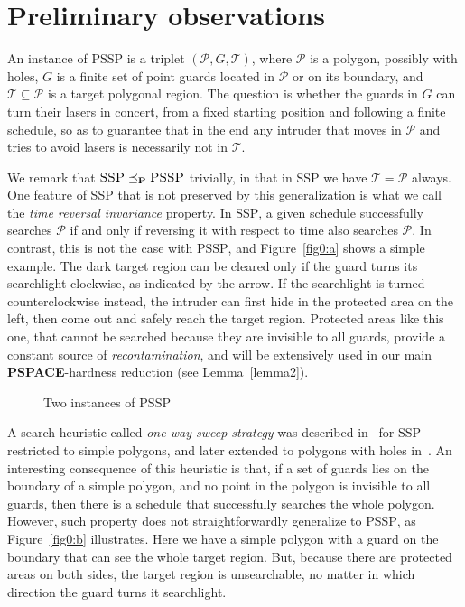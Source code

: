 \documentclass{style}
\newcommand{\complexityclass}[1]{\textbf{#1}}
\newcommand{\computproblem}[1]{\textsc{#1}}
\renewcommand{\P}{\complexityclass{P}\xspace}
\newcommand{\PSPACE}{\complexityclass{PSPACE}\xspace}
\newcommand{\SSP}{\computproblem{SSP}\xspace}
\newcommand{\PSSP}{\computproblem{PSSP}\xspace}
\begin{document}
\section{Preliminary observations}

An instance of \PSSP is a triplet $(\mathcal P,G,\mathcal T)$, where $\mathcal P$ is a polygon, possibly with holes, $G$ is a finite set of point guards located in $\mathcal P$ or on its boundary, and $\mathcal T \subseteq \mathcal P$ is a target polygonal region. The question is whether the guards in $G$ can turn their lasers in concert, from a fixed starting position and following a finite schedule, so as to guarantee that in the end any intruder that moves in $\mathcal P$ and tries to avoid lasers is necessarily not in $\mathcal T$.

We remark that $\SSP \preceq_{\P} \PSSP$ trivially, in that in \SSP we have $\mathcal T=\mathcal P$ always. One feature of \SSP that is not preserved by this generalization is what we call the \emph{time reversal invariance} property. In \SSP, a given schedule successfully searches $\mathcal P$ if and only if reversing it with respect to time also searches $\mathcal P$. In contrast, this is not the case with \PSSP, and Figure~\ref{fig0:a} shows a simple example. The dark target region can be cleared only if the guard turns its searchlight clockwise, as indicated by the arrow. If the searchlight is turned counterclockwise instead, the intruder can first hide in the protected area on the left, then come out and safely reach the target region. Protected areas like this one, that cannot be searched because they are invisible to all guards, provide a constant source of \emph{recontamination}, and will be extensively used in our main \PSPACE-hardness reduction (see Lemma~\ref{lemma2}).

\begin{figure}[h]
\centering
{}\qquad\qquad\quad
{}
\caption{Two instances of \PSSP}
\label{fig0}
\end{figure}

A search heuristic called \emph{one-way sweep strategy} was described in~\cite{search} for \SSP restricted to simple polygons, and later extended to polygons with holes in~\cite{search2}. An interesting consequence of this heuristic is that, if a set of guards lies on the boundary of a simple polygon, and no point in the polygon is invisible to all guards, then there is a schedule that successfully searches the whole polygon. However, such property does not straightforwardly generalize to \PSSP, as Figure~\ref{fig0:b} illustrates. Here we have a simple polygon with a guard on the boundary that can see the whole target region. But, because there are protected areas on both sides, the target region is unsearchable, no matter in which direction the guard turns it searchlight.
\end{document}
